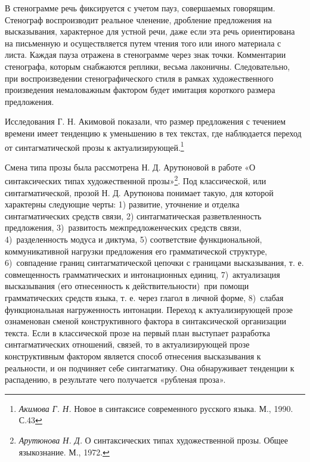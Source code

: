 \documentclass{kursa4}
\begin{document}
      В стенограмме речь фиксируется с учетом пауз, совершаемых говорящим. Стенограф воспроизводит реальное членение, дробление предложения на высказывания, характерное для устной речи, даже если эта речь ориентирована на письменную и осуществляется путем чтения того или иного материала с листа. Каждая пауза отражена в стенограмме через знак точки. Комментарии стенографа, которым снабжаются реплики, весьма лаконичны. Следовательно, при воспроизведении стенографического стиля в рамках художественного произведения немаловажным фактором будет имитация короткого размера предложения. 

      Исследования Г. Н. Акимовой показали, что размер предложения с течением времени имеет тенденцию к уменьшению в тех текстах, где наблюдается переход от синтагматической прозы к актуализирующей.\footnote{\textit{Акимова Г. Н.} Новое в синтаксисе современного русского языка. М., 1990. С.43} 

      Смена типа прозы была рассмотрена Н. Д. Арутюновой в работе «О синтаксических типах художественной прозы»\footnote{\textit{Арутюнова Н. Д.} О синтаксических типах художественной прозы. Общее языкознание. М., 1972.}. Под классической, или синтагматической, прозой Н. Д. Арутюнова понимает такую, для которой характерны следующие черты: 1) развитие, уточнение и отделка синтагматических средств связи, 2) синтагматическая разветвленность предложения, 3)~развитость межпредложенческих средств связи, 4)~разделенность модуса и диктума, 5) соответствие функциональной, коммуникативной нагрузки предложения его грамматической структуре, 6)~совпадение границ синтагматической цепочки с границами высказывания, т. е. совмещенность грамматических и интонационных единиц, 7)~актуализация высказывания (его отнесенность к действительности)~при помощи грамматических средств языка, т. е. через глагол в личной форме, 8)~слабая функциональная нагруженность интонации. Переход к актуализирующей прозе ознаменован сменой конструктивного фактора в синтаксической организации текста. Если в классической прозе на первый план выступает разработка синтагматических отношений, связей, то в актуализирующей прозе конструктивным фактором является способ отнесения высказывания к реальности, и он подчиняет себе синтагматику. Она обнаруживает тенденции к распадению, в результате чего получается «рубленая проза». 
\end{document}
